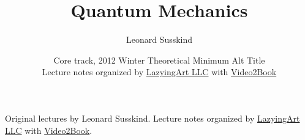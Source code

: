 \documentclass[11pt,oneside]{book}
\begin{document}
\frontmatter

\title{Quantum Mechanics}
\author{Leonard Susskind}
\date{Core track, 2012 Winter Theoretical Minimum Alt Title \\ Lecture notes organized by \href{https://lazying.art}{LazyingArt LLC} with \href{https://github.com/lachlanchen/Video2Book}{Video2Book}}
\maketitle
\begin{center}
\small Original lectures by Leonard Susskind. Lecture notes organized by \href{https://lazying.art}{LazyingArt LLC} with \href{https://github.com/lachlanchen/Video2Book}{Video2Book}.
\end{center}
\clearpage
\tableofcontents
\mainmatter










\end{document}
